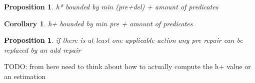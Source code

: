 \documentclass[twocolumn]{article}
\newtheorem{proposition}[theorem]{Proposition}
\newtheorem{corollary}[theorem]{Corollary}
\begin{document}
	\begin{proposition}
		h* bounded by min (pre+del) + amount of predicates
	\end{proposition}
	
	\begin{corollary}
		h+ bounded by min pre + amount of predicates
	\end{corollary}
	
	\begin{proposition}
		if there is at least one applicable action any pre repair can be replaced by an add repair
	\end{proposition}
	
	TODO: from here need to think about how to actually compute the h+ value or an estimation
%	
%	
%	
	
	
\end{document}
